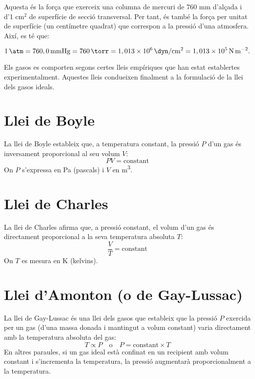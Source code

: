 Aquesta és la força que exerceix una columna de mercuri de 760 mm d'alçada i d'1 $\text{cm}^2$ de superfície de secció transversal. Per tant, és també la força per unitat de superfície (un centímetre quadrat) que correspon a la pressió d'una atmosfera. Així, es té que:

\[
1 \, \si{\atm} = 760,0 \, \si\mmHg= 760 \,\si\torr
= 1,013 \times 10^6 \, \si{\dyn\per\square\cm} = 1,013 \times 10^5 \, \si{\newton\per\square\meter}.
\]

Els gasos es comporten segons certes lleis empíriques que han estat establertes experimentalment. Aquestes lleis condueixen finalment a la formulació de la llei dels gasos ideals.

\section{Llei de Boyle}
La llei de Boyle estableix que, a temperatura constant, la pressió \( P \) d'un gas és inversament proporcional al seu volum \( V \):
\begin{equation}
    P V = \text{constant}
\end{equation}
On \( P \) s'expressa en \si{Pa} (pascals) i \( V \) en \si{m^3}.

\section{Llei de Charles}
La llei de Charles afirma que, a pressió constant, el volum d'un gas és directament proporcional a la seva temperatura absoluta \( T \):
\begin{equation}
    \frac{V}{T} = \text{constant}
\end{equation}
On \( T \) es mesura en \si{K} (kelvins).

\section{Llei d'Amonton (o de Gay-Lussac)}
La llei de Gay-Lussac és una llei dels gasos que estableix que la pressió \( P \) exercida per un gas (d'una massa donada i mantingut a volum constant) varia directament amb la temperatura absoluta del gas:
\begin{equation}
    T \propto P \quad \text{o} \quad P = \text{constant} \times T
\end{equation}
En altres paraules, si un gas ideal està confinat en un recipient amb volum constant i s'incrementa la temperatura, la pressió augmentarà proporcionalment a la temperatura.


